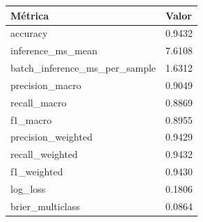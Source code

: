 \begin{tabular}{ll}
\hline
Métrica & Valor \\
\hline
accuracy & 0.9432 \\
inference\_ms\_mean & 7.6108 \\
batch\_inference\_ms\_per\_sample & 1.6312 \\
precision\_macro & 0.9049 \\
recall\_macro & 0.8869 \\
f1\_macro & 0.8955 \\
precision\_weighted & 0.9429 \\
recall\_weighted & 0.9432 \\
f1\_weighted & 0.9430 \\
log\_loss & 0.1806 \\
brier\_multiclass & 0.0864 \\
\hline
\end{tabular}
